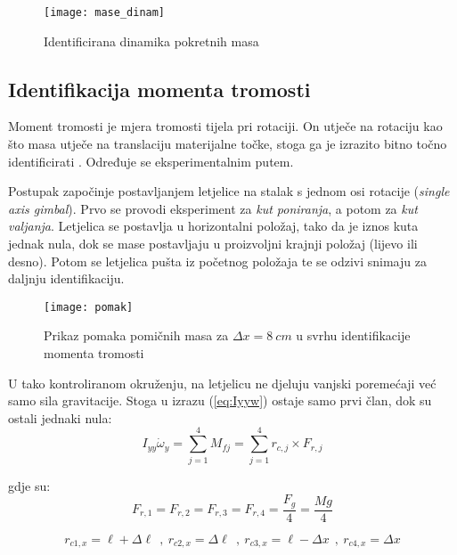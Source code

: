 \documentclass[11pt,a4paper]{article}
\begin{document}
\begin{figure}[H]
	\centering
	\texttt{[image: mase\_dinam]}
	\caption{Identificirana dinamika pokretnih masa}
	\label{fig:masa_din}
\end{figure}

\subsection{Identifikacija momenta tromosti}

Moment tromosti je mjera tromosti tijela pri rotaciji. On utječe na rotaciju kao što masa utječe na translaciju materijalne točke, stoga ga je izrazito bitno točno identificirati \cite{fiz1}. Određuje se eksperimentalnim putem. 

\medskip

Postupak započinje postavljanjem letjelice na stalak s jednom osi rotacije (\textit{single axis gimbal}). Prvo se provodi eksperiment za \textit{kut poniranja}, a potom za \textit{kut valjanja}. Letjelica se postavlja u horizontalni položaj, tako da je iznos kuta jednak nula, dok se mase postavljaju u proizvoljni krajnji položaj (lijevo ili desno). Potom se letjelica pušta iz početnog položaja te se odzivi snimaju za daljnju identifikaciju. 

\begin{figure}[H]
	\centering
	\texttt{[image: pomak]}
	\caption{Prikaz pomaka pomičnih masa za $\Delta x = 8 \ cm$ u svrhu identifikacije momenta tromosti}
	\label{fig:}
\end{figure}


\medskip

U tako kontroliranom okruženju, na letjelicu ne djeluju vanjski poremećaji već samo sila gravitacije. Stoga u izrazu (\ref{eq:Iyyw}) ostaje samo prvi član, dok su ostali jednaki nula:
\begin{equation}
I_{yy} \dot{\omega}_{y} = \sum_{j=1}^{4} M_{fj}  =  \sum_{j=1}^{4} r_{c,j} \times F_{r,j}
\label{eq:Iyyw2}
\end{equation}

gdje su:
\begin{equation}
F_{r,1} = F_{r,2} = F_{r,3} = F_{r,4} = \frac{F_{g}}{4} = \frac{Mg}{4}
\label{eq:F1234}
\end{equation}

\begin{equation}
r_{c1,x} = \ell + \Delta \ell \  \  , \ r_{c2,x} = \Delta \ell \  \ , \  r_{c3,x} = \ell - \Delta x \  \ , \  r_{c4,x} =  \Delta x
\label{eq:rcj}
\end{equation}
\end{document}
